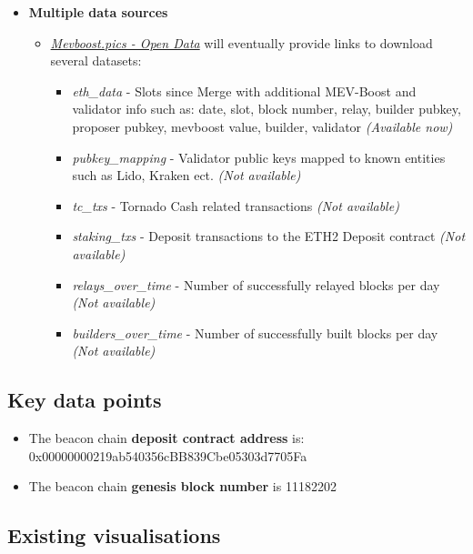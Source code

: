\documentclass[UTF8]{article}
\begin{document}
\begin{itemize}
\begin{itemize}
	\end{itemize}
	\item \textbf{Multiple data sources}
	\begin{itemize}
		\item \textit{\href{https://mevboost.pics/data.html}{Mevboost.pics - Open Data}} will eventually provide links to download several datasets: 
			\begin{itemize}
			\item \textit{eth\_data} - Slots since Merge with additional MEV-Boost and validator info such as: date, slot, block number, relay, builder pubkey, proposer pubkey, mevboost value, builder, validator \textit{(Available now)}
			\item \textit{pubkey\_mapping} - Validator public keys mapped to known entities such as Lido, Kraken ect. \textit{(Not available)}
			\item \textit{tc\_txs} - Tornado Cash related transactions \textit{(Not available)}
			\item \textit{staking\_txs} - Deposit transactions to the ETH2 Deposit contract \textit{(Not available)}
			\item \textit{relays\_over\_time} - Number of successfully relayed blocks per day \textit{(Not available)}
			\item \textit{builders\_over\_time} - Number of successfully built blocks per day \textit{(Not available)}
		\end{itemize}
	\end{itemize}
\end{itemize}

\subsection{Key data points}
\begin{itemize}
\item The beacon chain \textbf{deposit contract address} is: 0x00000000219ab540356cBB839Cbe05303d7705Fa 
\item The beacon chain \textbf{genesis block number} is 11182202
\end{itemize}

\subsection{Existing visualisations}
\end{document}
